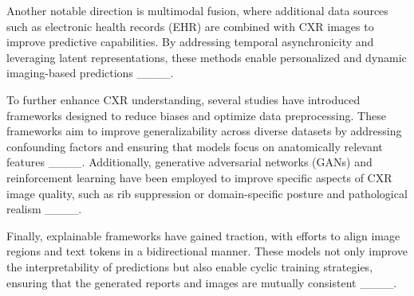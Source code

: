 Another notable direction is multimodal fusion, where additional data sources such as electronic health records (EHR) are combined with CXR images to improve predictive capabilities. By addressing temporal asynchronicity and leveraging latent representations, these methods enable personalized and dynamic imaging-based predictions ____.

To further enhance CXR understanding, several studies have introduced frameworks designed to reduce biases and optimize data preprocessing. These frameworks aim to improve generalizability across diverse datasets by addressing confounding factors and ensuring that models focus on anatomically relevant features ____. Additionally, generative adversarial networks (GANs) and reinforcement learning have been employed to improve specific aspects of CXR image quality, such as rib suppression or domain-specific posture and pathological realism ____.

Finally, explainable frameworks have gained traction, with efforts to align image regions and text tokens in a bidirectional manner. These models not only improve the interpretability of predictions but also enable cyclic training strategies, ensuring that the generated reports and images are mutually consistent ____.